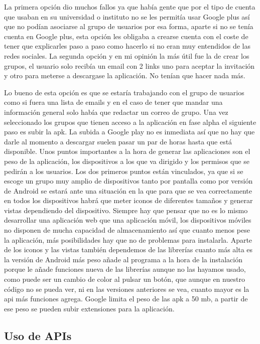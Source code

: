 La primera opción dio muchos fallos ya que había gente que por el tipo de cuenta que usaban en su universidad o instituto no se les permitía usar Google plus así que no podían asociarse al grupo de usuarios por esa forma, aparte si no se tenía cuenta en Google plus, esta opción les obligaba a crearse cuenta con el coste de tener que explicarles paso a paso como hacerlo si no eran muy entendidos de las redes sociales.
La segunda opción y en mi opinión la más útil fue la de crear los grupos, el usuario solo recibía un email con 2 links uno para aceptar la invitación y otro para meterse a descargase la aplicación. No tenían que hacer nada más.

Lo bueno de esta opción es que se estaría trabajando con el grupo de usuarios como si fuera una lista de emails y en el caso de tener que mandar una información general solo había que redactar un correo de grupo.
Una vez seleccionado los grupos que tienen acceso a la aplicación en fase alpha el siguiente paso es subir la apk.
La subida a Google play no es inmediata así que no hay que darle al momento a descargar suelen pasar un par de horas hasta que está disponible.
Unos puntos importantes a la hora de generar las aplicaciones son el peso de la aplicación, los dispositivos a los que va dirigido y los permisos que se pedirán a los usuarios.
Los dos primeros puntos están vinculados, ya que si se escoge un grupo muy amplio de dispositivos tanto por pantalla como por versión de Android se estará ante una situación en la que para que se vea correctamente en todos los dispositivos habrá que meter iconos de diferentes tamaños y generar vistas dependiendo del dispositivo.
Siempre hay que pensar que no es lo mismo desarrollar una aplicación web que una aplicación móvil, los dispositivos móviles no disponen de mucha capacidad de almacenamiento así que cuanto menos pese la aplicación, más posibilidades hay que no de problemas para instalarla.
Aparte de los iconos y las vistas también dependemos de las librerías cuanto más alta es la versión de Android más peso añade al programa a la hora de la instalación porque le añade funciones nueva de las librerías aunque no las hayamos usado, como puede ser un cambio de color al pulsar un botón, que aunque en nuestro código no se pueda ver, ni en las versiones anteriores se vea, cuanto mayor es la api más funciones agrega.
Google limita el peso de las apk a 50 mb, a partir de ese peso se pueden subir extensiones para la aplicación.

\subsection{Uso de APIs}
\label{subsecc:Uso de APIs}

